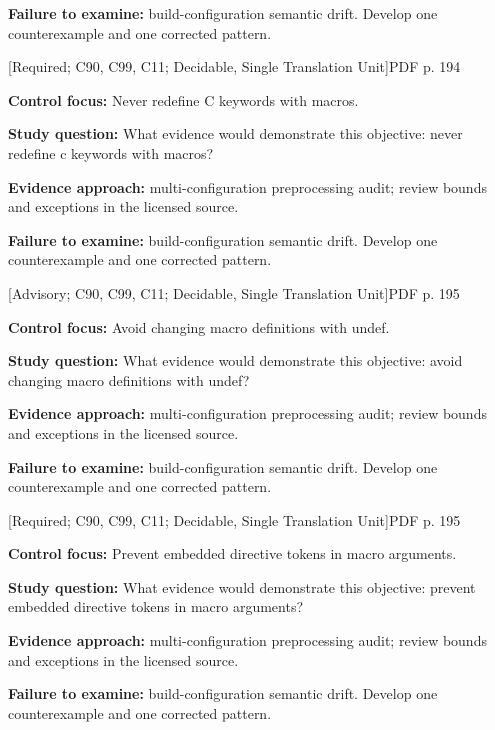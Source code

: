 \documentclass[10pt,letterpaper]{article}
\begin{document}
\textbf{Failure to examine:} build-configuration semantic drift. Develop one counterexample and one corrected pattern.\par
\smallskip
{}
 \textsf{\footnotesize [Required; C90, C99, C11; Decidable, Single Translation Unit]}\hfill{\footnotesize PDF p. 194}\par
\textbf{Control focus:} Never redefine C keywords with macros.\par
\textbf{Study question:} What evidence would demonstrate this objective: never redefine c keywords with macros?\par
\textbf{Evidence approach:} multi-configuration preprocessing audit; review bounds and exceptions in the licensed source.\par
\textbf{Failure to examine:} build-configuration semantic drift. Develop one counterexample and one corrected pattern.\par
\smallskip
{}
 \textsf{\footnotesize [Advisory; C90, C99, C11; Decidable, Single Translation Unit]}\hfill{\footnotesize PDF p. 195}\par
\textbf{Control focus:} Avoid changing macro definitions with undef.\par
\textbf{Study question:} What evidence would demonstrate this objective: avoid changing macro definitions with undef?\par
\textbf{Evidence approach:} multi-configuration preprocessing audit; review bounds and exceptions in the licensed source.\par
\textbf{Failure to examine:} build-configuration semantic drift. Develop one counterexample and one corrected pattern.\par
\smallskip
{}
 \textsf{\footnotesize [Required; C90, C99, C11; Decidable, Single Translation Unit]}\hfill{\footnotesize PDF p. 195}\par
\textbf{Control focus:} Prevent embedded directive tokens in macro arguments.\par
\textbf{Study question:} What evidence would demonstrate this objective: prevent embedded directive tokens in macro arguments?\par
\textbf{Evidence approach:} multi-configuration preprocessing audit; review bounds and exceptions in the licensed source.\par
\textbf{Failure to examine:} build-configuration semantic drift. Develop one counterexample and one corrected pattern.\par
\end{document}
